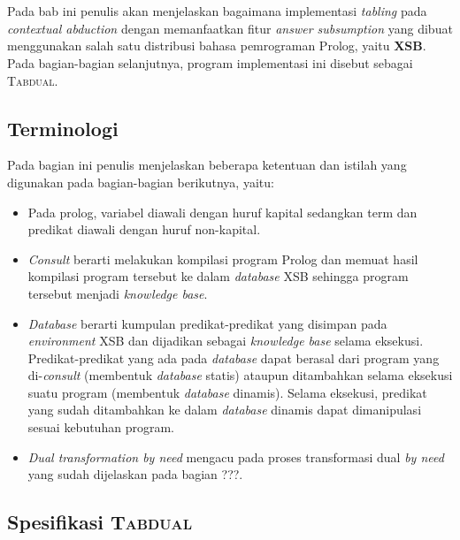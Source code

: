 \chapter{\babTiga}
Pada bab ini penulis akan menjelaskan bagaimana implementasi \textit{tabling} pada \textit{contextual abduction} dengan memanfaatkan fitur \textit{answer subsumption} yang dibuat menggunakan salah satu distribusi bahasa pemrograman Prolog, yaitu \textbf{XSB}. Pada bagian-bagian selanjutnya, program implementasi ini disebut sebagai \textsc{Tabdual}.

\section{Terminologi}

Pada bagian ini penulis menjelaskan beberapa ketentuan dan istilah yang digunakan pada bagian-bagian berikutnya, yaitu:

\begin{itemize}
	\item Pada prolog, variabel diawali dengan huruf kapital sedangkan term dan predikat diawali dengan huruf non-kapital.
	\item \textit{Consult} berarti melakukan kompilasi program Prolog dan memuat hasil kompilasi program tersebut ke dalam \textit{database} XSB sehingga program tersebut menjadi \textit{knowledge base}.
	\item \textit{Database} berarti kumpulan predikat-predikat yang disimpan pada \textit{environment} XSB dan dijadikan sebagai \textit{knowledge base} selama eksekusi. Predikat-predikat yang ada pada \textit{database} dapat berasal dari program yang di-\textit{consult} (membentuk \textit{database} statis) ataupun ditambahkan selama eksekusi suatu program (membentuk \textit{database} dinamis). Selama eksekusi, predikat yang sudah ditambahkan ke dalam \textit{database} dinamis dapat dimanipulasi sesuai kebutuhan program.
	\item \textit{Dual transformation by need} mengacu pada proses transformasi dual \textit{by need} yang sudah dijelaskan pada bagian ???.
\end{itemize}

\section{Spesifikasi \textsc{Tabdual}}


